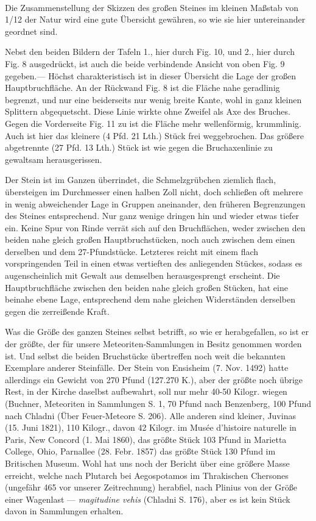 \documentclass[a4paper, 11pt, oneside, german]{article}
\begin{document}
\paragraph{}
Die Zusammenstellung der Skizzen des großen Steines im kleinen Maßstab von 1/12 der Natur wird eine gute Übersicht gewähren, so wie sie hier untereinander geordnet sind.

Nebst den beiden Bildern der Tafeln 1., hier durch Fig. 10, und 2., hier durch Fig. 8 ausgedrückt, ist auch die beide verbindende Ansicht von oben Fig. 9 gegeben.--- Höchst charakteristisch ist in dieser Übersicht die Lage der großen Hauptbruchfläche. An der Rückwand Fig. 8 ist die Fläche nahe geradlinig begrenzt, und nur eine beiderseits nur wenig breite Kante, wohl in ganz kleinen Splittern abgequetscht. Diese Linie wirkte ohne Zweifel als Axe des Bruches. Gegen die Vorderseite Fig. 11 zu ist die Fläche mehr wellenförmig, krummlinig. Auch ist hier das kleinere (4 Pfd. 21 Lth.) Stück frei weggebrochen. Das größere abgetrennte (27 Pfd. 13 Lth.) Stück ist wie gegen die Bruchaxenlinie zu gewaltsam herausgerissen.

Der Stein ist im Ganzen überrindet, die Schmelzgrübchen ziemlich flach, übersteigen im Durchmesser einen halben Zoll nicht, doch schließen oft mehrere in wenig abweichender Lage in Gruppen aneinander, den früheren Begrenzungen des Steines entsprechend. Nur ganz wenige dringen hin und wieder etwas tiefer ein. Keine Spur von Rinde verrät sich auf den Bruchflächen, weder zwischen den beiden nahe gleich großen Hauptbruchstücken, noch auch zwischen dem einen derselben und dem 27-Pfundstücke. Letzteres reicht mit einem flach vorspringenden Teil in einen etwas vertieften des anliegenden Stückes, sodass es augenscheinlich mit Gewalt aus demselben herausgesprengt erscheint. Die Hauptbruchfläche zwischen den beiden nahe gleich großen Stücken, hat eine beinahe ebene Lage, entsprechend dem nahe gleichen Widerständen derselben gegen die zerreißende Kraft.

Was die Größe des ganzen Steines selbst betrifft, so wie er herabgefallen, so ist er der größte, der für unsere Meteoriten-Sammlungen in Besitz genommen worden ist. Und selbst die beiden Bruchstücke übertreffen noch weit die bekannten Exemplare anderer Steinfälle. Der Stein von Ensisheim (7. Nov. 1492) hatte allerdings ein Gewicht von 270 Pfund (127.270 K.), aber der größte noch übrige Rest, in der Kirche daselbst aufbewahrt, soll nur mehr 40-50 Kilogr. wiegen (Buchner, Meteoriten in Sammlungen S. 1, 70 Pfund nach Benzenberg, 100 Pfund nach Chladni (Über Feuer-Meteore S. 206). Alle anderen sind kleiner, Juvinas (15. Juni 1821), 110 Kilogr., davon 42 Kilogr. im Musée d'histoire naturelle in Paris, New Concord (1. Mai 1860), das größte Stück 103 Pfund in Marietta College, Ohio, Parnallee (28. Febr. 1857) das größte Stück 130 Pfund im Britischen Museum. Wohl hat uns noch der Bericht über eine größere Masse erreicht, welche nach Plutarch bei Aegospotamos im Thrakischen Chersones (ungefähr 465 vor unserer Zeitrechnung) herabfiel, nach Plinius von der Größe einer Wagenlast --- \emph{magitudine vehis} (Chladni S. 176), aber es ist kein Stück davon in Sammlungen erhalten.
\end{document}
